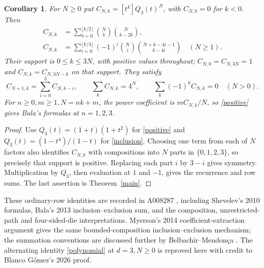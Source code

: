 \documentclass[11pt]{article}
\newtheorem{corollary}[theorem]{Corollary}
\newcommand{\coef}[2]{[#1^{#2}]}
\begin{document}
\begin{corollary}\label{rows}
For $N\geq0$ put $C_{N,k}=\coef{t}{k}Q_3(t)^N$, with
$C_{N,k}=0$ for $k<0$. Then
\begin{align}
 C_{N,k}&=\sum_{b=0}^{\lfloor k/2\rfloor}\binom Nb\binom N{k-2b},\label{positive}\\
 C_{N,k}&=\sum_{i=0}^{\lfloor k/4\rfloor}(-1)^i\binom Ni
                 \binom{N+k-4i-1}{k-4i}\quad(N\geq1).\label{inclusion}
\end{align}
Their support is $0\leq k\leq3N$, with positive values throughout;
$C_{N,0}=C_{N,3N}=1$ and $C_{N,k}=C_{N,3N-k}$ on that support.
They satisfy
\[
 C_{N+1,k}=\sum_{i=0}^3 C_{N,k-i},\qquad
 \sum_k C_{N,k}=4^N,\qquad \sum_k(-1)^k C_{N,k}=0\quad(N>0).
\]
For $n\geq0,m\geq1,N=nk+m$, the power coefficient is
$mC_{N,k}/N$, so \eqref{positive} gives Bala's formulas at $n=1,2,3$.
\end{corollary}
\begin{proof}
Use $Q_3(t)=(1+t)(1+t^2)$ for \eqref{positive} and
$Q_3(t)=(1-t^4)/(1-t)$ for \eqref{inclusion}.
Choosing one term from each of $N$ factors also identifies $C_{N,k}$
with compositions into $N$ parts in $\{0,1,2,3\}$, so precisely that
support is positive. Replacing each part $i$ by $3-i$ gives symmetry.
Multiplication by $Q_3$, then evaluation at $1$ and $-1$, gives the
recurrence and row sums. The last assertion is Theorem~\ref{main}.
\end{proof}
These ordinary-row identities are recorded in A008287 \cite{quadrinomial},
including Shevelev's 2010 formulas, Bala's 2013 inclusion--exclusion sum,
and the composition, unrestricted-path and four-sided-die interpretations.
Myerson's 2014 coefficient-extraction argument \cite{myerson} gives
the same bounded-composition inclusion--exclusion mechanism; the
summation conventions are discussed further by Belbachir--Mendon\c ca
\cite[Section 3.3, Remark 3.2 and Proposition 3.3]{belbachir}.
The alternating identity \eqref{polynomial} at $d=3,N\geq0$ is reproved
here with credit to Blanco G\'omez's 2026 proof.
\end{document}
